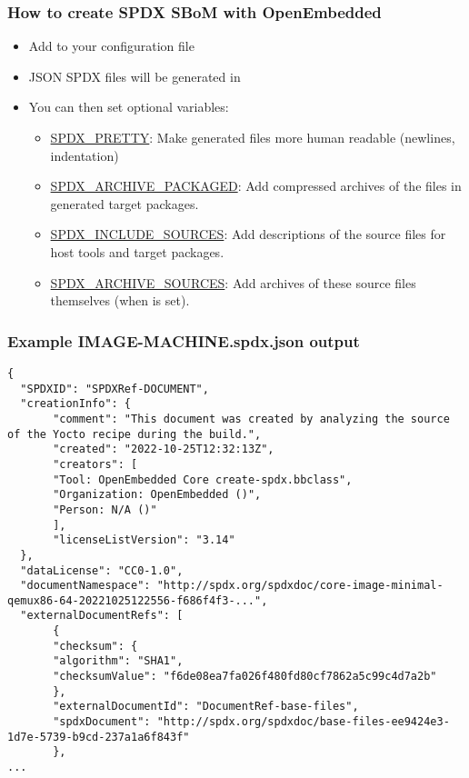 \begin{frame}[fragile]
  \frametitle{How to create SPDX SBoM with OpenEmbedded}
  \begin{itemize}
     \item Add  to your configuration file
     \item JSON SPDX files will be generated in 
     \item You can then set optional variables:
           \begin{itemize}
	      \item \href{https://docs.yoctoproject.org/ref-manual/variables.html\#term-SPDX_PRETTY}{SPDX\_PRETTY}:
		    Make generated files more human readable (newlines, indentation)
	      \item \href{https://docs.yoctoproject.org/ref-manual/variables.html\#term-SPDX_ARCHIVE_PACKAGED}{SPDX\_ARCHIVE\_PACKAGED}:
		    Add compressed archives of the files in generated target packages.
	      \item \href{https://docs.yoctoproject.org/ref-manual/variables.html\#term-SPDX_INCLUDE_SOURCES}{SPDX\_INCLUDE\_SOURCES}:
		    Add descriptions of the source files for host tools and target packages.
	      \item \href{https://docs.yoctoproject.org/ref-manual/variables.html#term-SPDX_ARCHIVE_SOURCES}{SPDX\_ARCHIVE\_SOURCES}:
		    Add archives of these source files themselves (when  is set).
           \end{itemize}
  \end{itemize}
\end{frame}

\begin{frame}[fragile]
  \frametitle{Example IMAGE-MACHINE.spdx.json output}
  \begin{block}{}
    \fontsize{7}{7}\selectfont
    \begin{verbatim}
{
  "SPDXID": "SPDXRef-DOCUMENT",
  "creationInfo": {
       "comment": "This document was created by analyzing the source of the Yocto recipe during the build.",
       "created": "2022-10-25T12:32:13Z",
       "creators": [
       "Tool: OpenEmbedded Core create-spdx.bbclass",
       "Organization: OpenEmbedded ()",
       "Person: N/A ()"
       ],
       "licenseListVersion": "3.14"
  },
  "dataLicense": "CC0-1.0",
  "documentNamespace": "http://spdx.org/spdxdoc/core-image-minimal-qemux86-64-20221025122556-f686f4f3-...",
  "externalDocumentRefs": [
       {
       "checksum": {
       "algorithm": "SHA1",
       "checksumValue": "f6de08ea7fa026f480fd80cf7862a5c99c4d7a2b"
       },
       "externalDocumentId": "DocumentRef-base-files",
       "spdxDocument": "http://spdx.org/spdxdoc/base-files-ee9424e3-1d7e-5739-b9cd-237a1a6f843f"
       },
...
    \end{verbatim}
  \end{block}
\end{frame}

